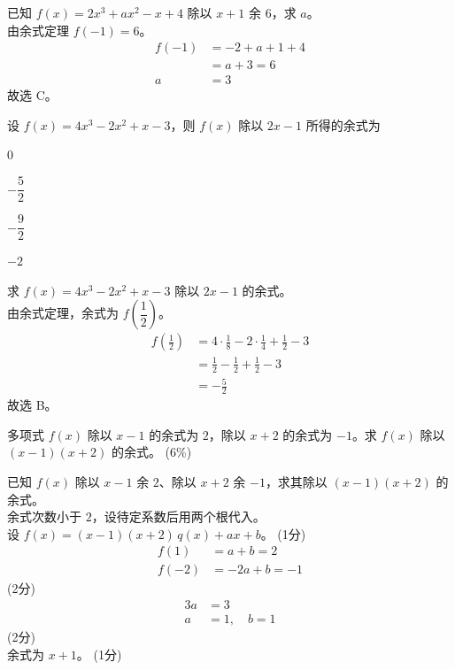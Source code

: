 \documentclass{exam-zh}
\begin{document}
\begin{solution}
    已知 $f(x)=2x^3+ax^2-x+4$ 除以 $x+1$ 余 $6$，求 $a$。 \\
    由余式定理 $f(-1)=6$。
    \begin{align*}
        f(-1) &= -2+a+1+4 \\
        &= a+3 = 6 \\
        a &= 3
    \end{align*}
    故选 C。
\end{solution}

\begin{question}
    设 $f(x)=4x^3-2x^2+x-3$，则 $f(x)$ 除以 $2x-1$ 所得的余式为 \paren[B]
    \begin{choices}
        \item $0$
        \item $-\dfrac{5}{2}$
        \item $-\dfrac{9}{2}$
        \item $-2$
    \end{choices}
\end{question}

\begin{solution}
    求 $f(x)=4x^3-2x^2+x-3$ 除以 $2x-1$ 的余式。 \\
    由余式定理，余式为 $f\!\left(\dfrac12\right)$。
    \begin{align*}
        f\!\left(\frac12\right) &= 4\cdot\frac18-2\cdot\frac14+\frac12-3 \\
        &= \frac12-\frac12+\frac12-3 \\
        &= -\frac52
    \end{align*}
    故选 B。
\end{solution}

\begin{question}[points = 6]
    多项式 $f(x)$ 除以 $x-1$ 的余式为 $2$，除以 $x+2$ 的余式为 $-1$。求 $f(x)$ 除以 $(x-1)(x+2)$ 的余式。
    \hfill (6\%)
\end{question}

\begin{solution}
    已知 $f(x)$ 除以 $x-1$ 余 $2$、除以 $x+2$ 余 $-1$，求其除以 $(x-1)(x+2)$ 的余式。 \\
    余式次数小于 $2$，设待定系数后用两个根代入。 \\
    设 $f(x)=(x-1)(x+2)\,q(x)+ax+b$。
    \hfill (1分)
    \begin{align*}
        f(1) &= a+b = 2 \\
        f(-2) &= -2a+b = -1
    \end{align*}
    \hfill (2分) \\
    \begin{align*}
        3a &= 3 \\
        a &= 1,\quad b = 1
    \end{align*}
    \hfill (2分) \\
    余式为 $x+1$。
    \hfill (1分)
\end{solution}
\end{document}
